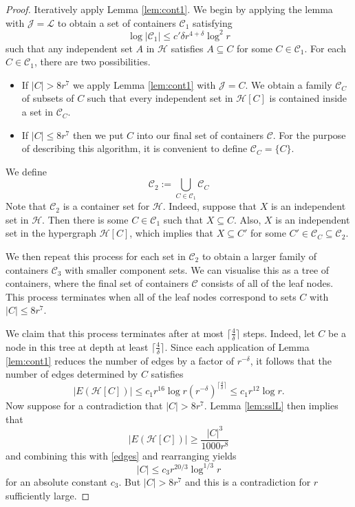 \documentclass[10pt,a4paper]{amsart}
\newcommand{\cC}{\mathcal{C}}
\newcommand{\cH}{\mathcal{H}}
\newcommand{\cJ}{\mathcal{J}}
\newcommand{\cL}{\mathcal{L}}
\begin{document}
\begin{proof}



    Iteratively apply Lemma \ref{lem:cont1}. We begin by applying the lemma with $\cJ=\cL$ to obtain a set of containers $\cC_{1}$ satisfying 
    \[
    \log | \cC_1| \leq c' \delta r^{4+\delta} \log^2 r
    \]
    such that any independent set $A$ in $\cH$ satisfies $A \subseteq C$ for some $C \in \cC_{1}$. For each $C \in \cC_{1}$, there are two possibilities.
    \begin{itemize}
    \item If $|C| > 8r^7$ we apply Lemma \ref{lem:cont1} with $\cJ=C$. We obtain a family $\cC_{C}$ of subsets of $C$ such that every independent set in $\cH[C]$ is contained inside a set in $\cC_{C}$.
        \item If $|C| \leq 8r^7$ then we put $C$ into our final set of containers $\cC$. For the purpose of describing this algorithm, it is convenient to define $\cC_{C}= \{ C \}$.
    \end{itemize}
We define 
\[
\cC_2:= \bigcup_{C \in \cC_1} \cC_C
\]
Note that $\mathcal C_2$ is a container set for $\cH$. Indeed, suppose that $X$ is an independent set in $\cH$. Then there is some $C \in \mathcal C_1$ such that $X \subseteq C$. Also, $X$ is an independent set in the hypergraph $\cH[C]$, which implies that $X \subseteq C'$ for some $C' \in \mathcal C_C \subseteq \mathcal C_2$.
    
    We then repeat this process for each set in $\cC_2$ to obtain a larger family of containers $\cC_3$ with smaller component sets. We can visualise this as a tree of containers, where the final set of containers $\cC$ consists of all of the leaf nodes. This process terminates when all of the leaf nodes correspond to sets $C$ with $|C| \leq 8r^7$. 
    
    We claim that this process terminates after at most $\lceil \frac{4}{\delta} \rceil$ steps. Indeed, let $C$ be a node in this tree at depth at least $\lceil \frac{4}{\delta}\rceil $. Since each application of Lemma \ref{lem:cont1} reduces the number of edges by a factor of $r^{-\delta}$, it follows that the number of edges determined by $C$ satisfies
    \begin{equation} \label{edges}
    |E(\cH[C])| \leq c_1r^{16} \log r(r^{-\delta})^{\lceil \frac{4}{\delta}\rceil }\leq c_1r^{12} \log r.
    \end{equation}
     Now suppose for a contradiction that $|C| > 8r^7$. Lemma \ref{lem:sslL} then implies that
    \[
   | E(\cH[C])| \geq \frac{|C|^3}{1000r^8}
    \]
    and combining this with \eqref{edges} and rearranging yields
    \[
    |C| \leq c_3 r^{20/3} \log^{1/3} r
    \]
    for an absolute constant $c_3$. But $|C| > 8r^7$ and this is a contradiction for $r$ sufficiently large.


\end{proof}
\end{document}

